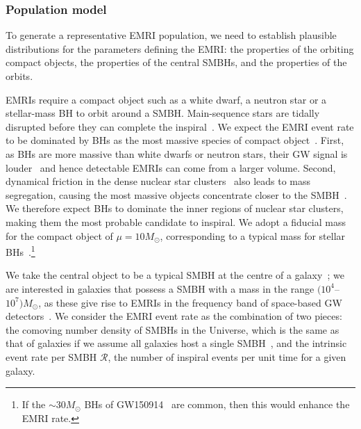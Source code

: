 \documentclass[aps,prd,amsfonts,amssymb,amsmath,nofootinbib,showpacs,superscriptaddress,twocolumn,floatfix]{revtex4-1}
\begin{document}
\subsubsection{Population model}

To generate a representative EMRI population, we need to establish plausible distributions for the parameters defining the EMRI: the properties of the orbiting compact objects, the properties of the central SMBHs, and the properties of the orbits. 

EMRIs require a compact object such as a white dwarf, a neutron star or a stellar-mass BH to orbit around a SMBH. Main-sequence stars are tidally disrupted before they can complete the inspiral~\cite{Rees1988,Sigurdsson1997}. We expect the EMRI event rate to be dominated by BHs as the most massive species of compact object~\cite{Gair2004}. First, as BHs are more massive than white dwarfs or neutron stars, their GW signal is louder~\cite{Peters1963,Barack2004} and hence detectable EMRIs can come from a larger volume. Second, dynamical friction in the dense nuclear star clusters~\cite{Chandrasekhar1960,Antonini2011} also leads to mass segregation, causing the most massive objects concentrate closer to the SMBH~\cite{Bahcall1977,Freitag2006,Alexander2009}. We therefore expect BHs to dominate the inner regions of nuclear star clusters, making them the most probable candidate to inspiral. We adopt a fiducial mass for the compact object of $\mu = 10 M_\odot$, corresponding to a typical mass for stellar BHs~\cite{Casares2014,Corral-Santana2016,Tetarenko2016,Abbott2016d}.\footnote{If the $\sim30 M_\odot$ BHs of GW150914~\cite{Abbott2016f,Abbott2016d} are common, then this would enhance the EMRI rate.}

We take the central object to be a typical SMBH at the centre of a galaxy~\cite{Kormendy1995,Ferrarese2005}; we are interested in galaxies that possess a SMBH with a mass in the range $(10^{4}$--$10^7) M_\odot$, as these give rise to EMRIs in the frequency band of space-based GW detectors~\cite{Amaro-Seoane2007,Amaro-Seoane2012a}. We consider the EMRI event rate as the combination of two pieces: the comoving number density of SMBHs in the Universe, which is the same as that of galaxies if we assume all galaxies host a single SMBH~\cite{Lynden-Bell1971,Soltan1982}, and the intrinsic event rate per SMBH $\mathcal{R}$, the number of inspiral events per unit time for a given galaxy.
\end{document}
